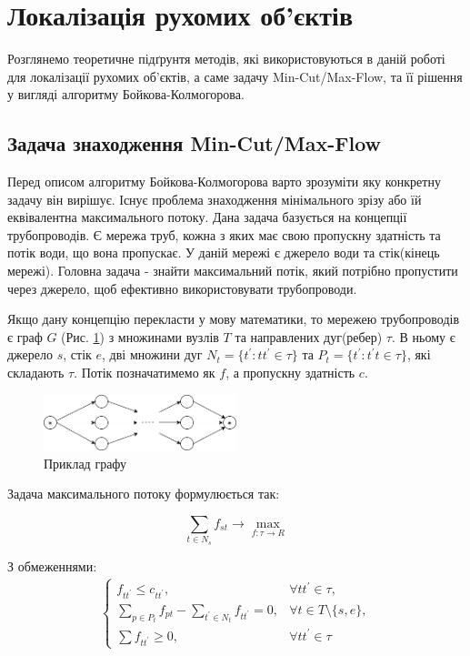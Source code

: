 \section{Локалізація рухомих об'єктів}

Розглянемо теоретичне підґрунтя методів, які використовуються в даній роботі для
локалізації рухомих об'єктів, а саме задачу Min-Cut/Max-Flow, та її рішення
у вигляді алгоритму Бойкова-Колмогорова.

\subsection{Задача знаходження Min-Cut/Max-Flow}

Перед описом алгоритму Бойкова-Колмогорова варто зрозуміти яку конкретну
задачу він вирішує. Існує проблема знаходження мінімального зрізу або їй
еквівалентна максимального потоку. Дана задача базується на концепції
трубопроводів. Є мережа труб, кожна з яких має свою пропускну здатність
та потік води, що вона пропускає. У даній мережі є джерело води та стік(кінець мережі).
Головна задача - знайти максимальний потік, який потрібно пропустити через джерело,
щоб ефективно використовувати трубопроводи.

Якщо дану концепцію перекласти у мову
математики, то мережею трубопроводів є граф $G$ (Рис. \ref{fig:graph_example})
з множинами вузлів $T$ та направлених дуг(ребер) $\tau$. В ньому є джерело $s$,
стік $e$, дві множини дуг $N_t = \{t^{'}: tt^{'} \in \tau \}$ та $P_t = \{t^{'}: t^{'}t \in \tau \}$,
які складають $\tau$. Потік позначатимемо як $f$, а пропускну здатність $c$.

\begin{figure}[H]
    \centering
    \includegraphics[width=0.5\textwidth]{images/graph_example}
    \caption{Приклад графу
        \label{fig:graph_example}
    }
\end{figure}

Задача максимального потоку формулюється так:

\begin{equation*}
    \sum_{t \in N_s} f_{st} \rightarrow \max_{f: \tau \rightarrow R }
\end{equation*}

З обмеженнями:
\begin{equation*}
    \begin{gathered}
        \begin{cases}
            f_{tt^{'}} \leq  c_{tt^{'}},                                   & \forall tt^{'}  \in \tau ,         \\
            \sum_{p \in P_t} f_{pt} - \sum_{t^{'} \in N_t} f_{tt^{'}} = 0, & \forall t \in T \setminus \{s,e\}, \\
            \sum f_{tt^{'}} \geq 0,                                        & \forall tt^{'}  \in \tau
        \end{cases}
    \end{gathered}
\end{equation*}

